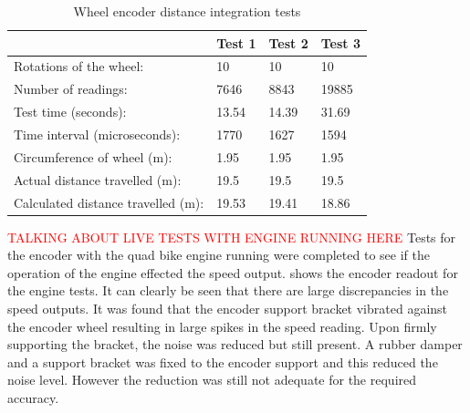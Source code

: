 \documentclass[main.tex]{subfiles}
\begin{document}
\begin{table}[ht]
\centering
\caption{Wheel encoder distance integration tests}
\begin{tabular}{l|l|l|l}
                                   & Test 1 & Test 2 & Test 3 \\ \hline
Rotations of the wheel:            & 10     & 10     & 10     \\
Number of readings:                & 7646   & 8843   & 19885  \\
Test time (seconds):               & 13.54  & 14.39  & 31.69  \\
Time interval (microseconds):      & 1770   & 1627   & 1594   \\
Circumference of wheel (m):        & 1.95   & 1.95   & 1.95   \\
Actual distance travelled (m):     & 19.5   & 19.5   & 19.5   \\
Calculated distance travelled (m): & 19.53  & 19.41  & 18.86  \\
\end{tabular}
\end{table}

\textcolor{red}{TALKING ABOUT LIVE TESTS WITH ENGINE RUNNING HERE}
Tests for the encoder with the quad bike engine running were completed to see if the operation of the engine effected the speed output.  shows the encoder readout for the engine tests. It can clearly be seen that there are large discrepancies in the speed outputs. It was found that the encoder support bracket vibrated against the encoder wheel resulting in large spikes in the speed reading. Upon firmly supporting the bracket, the noise was reduced but still present. A rubber damper and a support bracket was fixed to the encoder support and this reduced the noise level. However the reduction was still not adequate for the required accuracy. 
\end{document}
